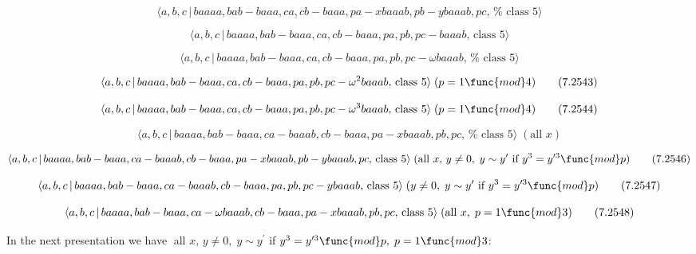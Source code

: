 \documentclass[10pt]{article}
\begin{document}
\begin{equation}
\langle a,b,c\,|\,baaaa,bab-baaa,ca,cb-baaa,pa-xbaaab,pb-ybaaab,pc,\,\text{%
class }5\rangle  \tag{7.2540}
\end{equation}

\begin{equation}
\langle a,b,c\,|\,baaaa,bab-baaa,ca,cb-baaa,pa,pb,pc-baaab,\,\text{class }%
5\rangle  \tag{7.2541}
\end{equation}

\begin{equation}
\langle a,b,c\,|\,baaaa,bab-baaa,ca,cb-baaa,pa,pb,pc-\omega baaab,\,\text{%
class }5\rangle  \tag{7.2542}
\end{equation}

\begin{equation}
\langle a,b,c\,|\,baaaa,bab-baaa,ca,cb-baaa,pa,pb,pc-\omega ^{2}baaab,\,%
\text{class }5\rangle \;(p=1\func{mod}4)  \tag{7.2543}
\end{equation}

\begin{equation}
\langle a,b,c\,|\,baaaa,bab-baaa,ca,cb-baaa,pa,pb,pc-\omega ^{3}baaab,\,%
\text{class }5\rangle \;(p=1\func{mod}4)  \tag{7.2544}
\end{equation}

\begin{equation}
\langle a,b,c\,|\,baaaa,bab-baaa,ca-baaab,cb-baaa,pa-xbaaab,pb,pc,\,\text{%
class }5\rangle \;(\text{all }x)  \tag{7.2545}
\end{equation}

\begin{equation}
\langle a,b,c\,|\,baaaa,bab-baaa,ca-baaab,cb-baaa,pa-xbaaab,pb-ybaaab,pc,\,%
\text{class }5\rangle \;(\text{all }x,\,y\neq 0,\;y\sim y^{\prime }\text{ if 
}y^{3}=y^{\prime 3}\func{mod}p)  \tag{7.2546}
\end{equation}

\begin{equation}
\langle a,b,c\,|\,baaaa,bab-baaa,ca-baaab,cb-baaa,pa,pb,pc-ybaaab,\,\text{%
class }5\rangle \;(y\neq 0,\;y\sim y^{\prime }\text{ if }y^{3}=y^{\prime 3}%
\func{mod}p)  \tag{7.2547}
\end{equation}

\begin{equation}
\langle a,b,c\,|\,baaaa,bab-baaa,ca-\omega baaab,cb-baaa,pa-xbaaab,pb,pc,\,%
\text{class }5\rangle \;(\text{all }x,\;p=1\func{mod}3)  \tag{7.2548}
\end{equation}

In the next presentation we have $\;$all $x,\,y\neq 0,\;y\sim y^{\prime }$
if $y^{3}=y^{\prime 3}\func{mod}p,\;p=1\func{mod}3$:
\end{document}
